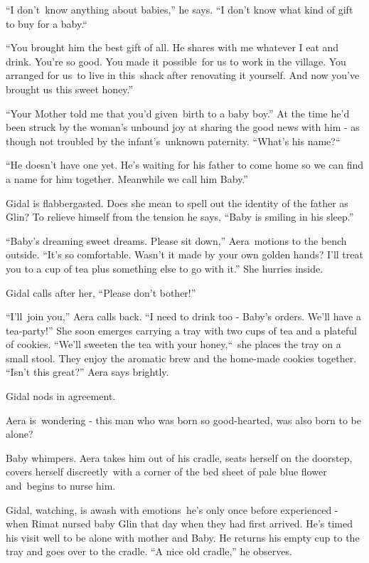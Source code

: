 \documentclass[twoside,11pt]{book}
\begin{document}
 ``I don't~know anything about babies,'' he says. ``I don't know what kind of
gift to buy for a baby.``\ 

``You brought him the best gift of all. He shares with me whatever I eat and drink. You're so good. You
made it possible{\ }for us to work in the village. You arranged for us~to live
in this~shack after renovating it yourself. And now you've brought us this sweet honey.'' 

``Your Mother told me that you'd given{\ }birth to a baby
boy.'' At the time he'd been struck by the woman's unbound joy at sharing the good news with him {}- as
though not troubled by the infant's{\ }unknown paternity. ``What's his
name?``\ 

``He doesn't have one yet. He's waiting for his father to come home so we can find a name for him together.
Meanwhile we call him Baby.'' 

Gidal is flabbergasted. Does she mean to spell out the identity of the father as Glin? To relieve himself from the
tension he says, ``Baby is smiling in his sleep.'' ~

``Baby{}'s dreaming sweet dreams. Please sit down,'' Aera\ motions to the bench
outside{.} ``It's so comfortable. Wasn't it made by your own
golden hands? I'll treat you to a cup of tea plus something else to go with it.'' She hurries inside. 

Gidal calls after her, ``Please don't bother!''

``I'll\ join you,'' Aera calls back. ``I need to drink too - Baby's orders. We'll
have a tea-party!'' She soon emerges carrying a tray with two cups of tea and a plateful of cookies.
``We'll sweeten the tea with your honey,``{\ }she
places the tray on a small stool. They enjoy the aromatic brew and the home-made cookies together. ``Isn't
this great?'' Aera says brightly. 

Gidal nods in agreement. 

Aera is\ wondering - this man who was born so good-hearted, was also born to be alone?

Baby whimpers. Aera takes him out of his cradle, seats herself on the doorstep, covers herself
discreetly{\ }with a corner of the bed sheet of pale blue flower and~begins to
nurse him. 

Gidal, watching, is awash with emotions{\ }he's only once before experienced - when Rimat nursed baby
Glin that day when they had first arrived. He's timed his visit well to be alone with mother and Baby. He returns his
empty cup to the tray and goes over to the cradle. ``A nice old cradle,'' he
observes{.}
\end{document}
